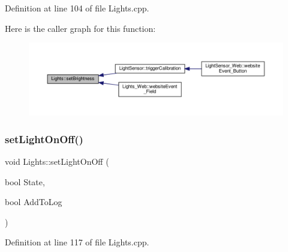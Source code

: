 Definition at line 104 of file Lights.\+cpp.

Here is the caller graph for this function\+:
\nopagebreak
\begin{figure}[H]
\begin{center}
\leavevmode
\includegraphics[width=350pt]{class_lights_a94b8cac76cd536d361b9b634511ac371_icgraph}
\end{center}
\end{figure}
\mbox{\label{class_lights_ab18f05b043b61b6eb74bd7b564e1a1ec}} 
\subsubsection{\texorpdfstring{set\+Light\+On\+Off()}{setLightOnOff()}\hspace{0.1cm}{\footnotesize\ttfamily [1/2]}}
{\footnotesize\ttfamily void Lights\+::set\+Light\+On\+Off (\begin{DoxyParamCaption}\item[{bool}]{State,  }\item[{bool}]{Add\+To\+Log }\end{DoxyParamCaption})}



Definition at line 117 of file Lights.\+cpp.


